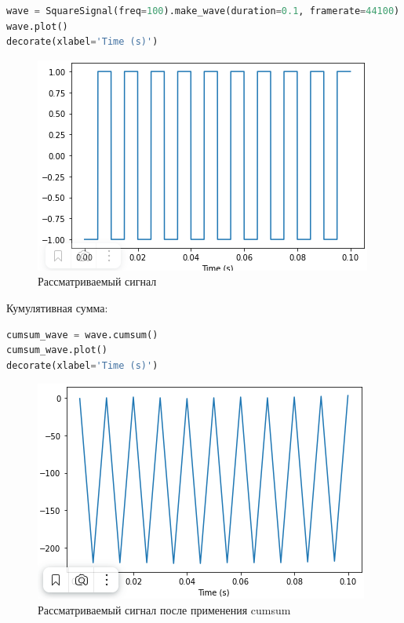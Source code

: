 \begin{lstlisting}[language=Python]
wave = SquareSignal(freq=100).make_wave(duration=0.1, framerate=44100)
wave.plot()
decorate(xlabel='Time (s)')
\end{lstlisting}
\begin{figure}[H]
	\begin{center}
		\includegraphics[scale=1]{fig/lab09/lab9_4.png}
		\caption{Рассматриваемый сигнал}
	\end{center}
\end{figure}

Кумулятивная сумма:

\begin{lstlisting}[language=Python]
cumsum_wave = wave.cumsum()
cumsum_wave.plot()
decorate(xlabel='Time (s)')
\end{lstlisting}
\begin{figure}[H]
	\begin{center}
		\includegraphics[scale=1]{fig/lab09/lab9_5.png}
		\caption{Рассматриваемый сигнал после применения cumsum}
	\end{center}
\end{figure}

